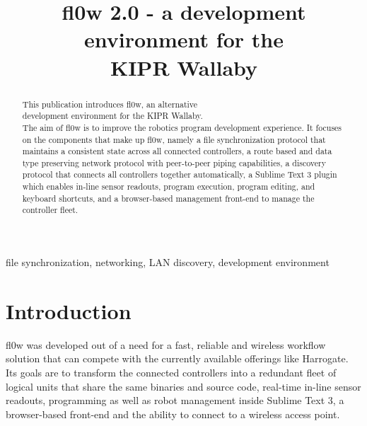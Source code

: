 \documentclass[conference]{IEEEtran}
\begin{document}
\title{fl0w 2.0 - a development environment for the\\ KIPR Wallaby}
\author{
}
\maketitle


\begin{abstract}
This publication introduces fl0w\cite{fl0w:Philip Trauner}, an alternative\\ development environment for the KIPR Wallaby\cite{Wallaby Controller:KIPR}.\\ The aim of fl0w\cite{fl0w:Philip Trauner} is to improve the robotics program development experience. It focuses on the components that make up fl0w\cite{fl0w:Philip Trauner}, namely a file synchronization protocol that maintains a consistent state across all connected controllers, a route based and data type preserving network protocol with peer-to-peer piping capabilities, a discovery protocol that connects all controllers together automatically, a Sublime Text 3\cite{Sublime Text 3:Sublime HQ} plugin which enables in-line sensor readouts, program execution, program editing, and keyboard shortcuts, and a browser-based management front-end to manage the controller fleet.\\
\end{abstract}

\begin{IEEEkeywords}
file synchronization, networking, LAN discovery, development environment
\end{IEEEkeywords}



\section{Introduction}
fl0w\cite{fl0w:Philip Trauner} was developed out of a need for a fast, reliable and wireless workflow solution that can compete with the currently available offerings like Harrogate\cite{Harrogate:KIPR}. Its goals are to transform the connected controllers into a redundant fleet of logical units that share the same binaries and source code, real-time in-line sensor readouts, programming as well as robot management inside Sublime Text 3\cite{Sublime Text 3:Sublime HQ}, a browser-based front-end and the ability to connect to a wireless access point.
\end{document}

